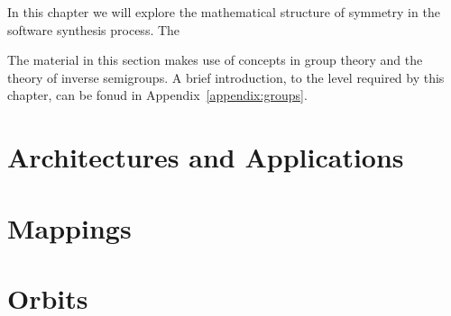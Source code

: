 In this chapter we will explore the mathematical structure of symmetry in the software synthesis process. The
\blindtext[2]

The material in this section makes use of concepts in group theory and the theory of inverse semigroups. A brief introduction, to the level required by this chapter, can be fonud in Appendix~\ref{appendix:groups}.

\section{Architectures and Applications}
\Blindtext[5]

\section{Mappings}
\Blindtext[5]

\section{Orbits}
\Blindtext[5]